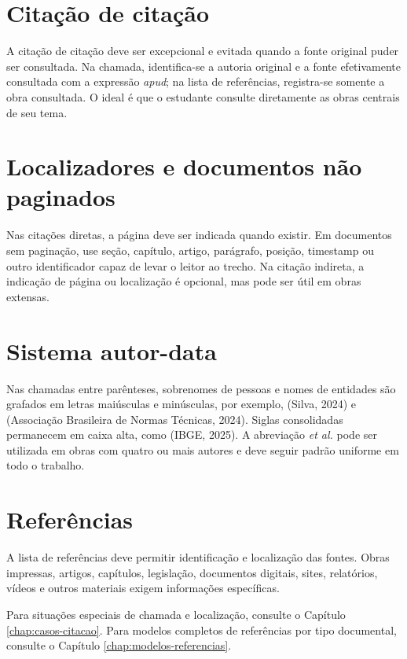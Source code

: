 \section{Citação de citação}

A citação de citação deve ser excepcional e evitada quando a fonte original puder ser consultada. Na chamada, identifica-se a autoria original e a fonte efetivamente consultada com a expressão \emph{apud}; na lista de referências, registra-se somente a obra consultada. O ideal é que o estudante consulte diretamente as obras centrais de seu tema.

\section{Localizadores e documentos não paginados}

Nas citações diretas, a página deve ser indicada quando existir. Em documentos sem paginação, use seção, capítulo, artigo, parágrafo, posição, timestamp ou outro identificador capaz de levar o leitor ao trecho. Na citação indireta, a indicação de página ou localização é opcional, mas pode ser útil em obras extensas.

\section{Sistema autor-data}

Nas chamadas entre parênteses, sobrenomes de pessoas e nomes de entidades são grafados em letras maiúsculas e minúsculas, por exemplo, (Silva, 2024) e (Associação Brasileira de Normas Técnicas, 2024). Siglas consolidadas permanecem em caixa alta, como (IBGE, 2025). A abreviação \emph{et al.} pode ser utilizada em obras com quatro ou mais autores e deve seguir padrão uniforme em todo o trabalho.

\section{Referências}

A lista de referências deve permitir identificação e localização das fontes. Obras impressas, artigos, capítulos, legislação, documentos digitais, sites, relatórios, vídeos e outros materiais exigem informações específicas.

Para situações especiais de chamada e localização, consulte o Capítulo \ref{chap:casos-citacao}. Para modelos completos de referências por tipo documental, consulte o Capítulo \ref{chap:modelos-referencias}.

